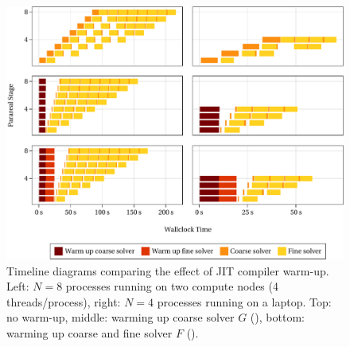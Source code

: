 \begin{figure}[p]
  \includegraphics[width=\textwidth]{figures/fig_impl_warmup2.pdf}
  \caption[Timeline diagrams comparing the effect of JIT compiler warm-up]{%
    Timeline diagrams comparing the effect of \acs{JIT} compiler warm-up.
    Left: $N=8$ processes running on two compute nodes (4 threads/process),
    right: $N=4$ processes running on a laptop.
    Top: no warm-up,
    middle: warming up coarse solver $G$ (),
    bottom: warming up coarse and fine solver $F$ ().
  }
  \label{fig:impl:warmup}
\end{figure}


